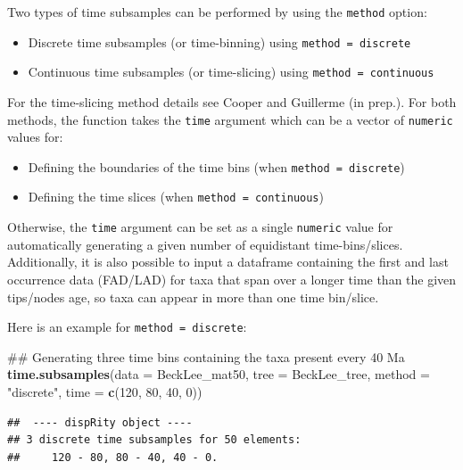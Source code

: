 \documentclass[]{book}
\newenvironment{Shaded}{\begin{snugshade}}{\end{snugshade}}
\newcommand{\KeywordTok}[1]{\textcolor[rgb]{0.13,0.29,0.53}{\textbf{#1}}}
\newcommand{\DataTypeTok}[1]{\textcolor[rgb]{0.13,0.29,0.53}{#1}}
\newcommand{\DecValTok}[1]{\textcolor[rgb]{0.00,0.00,0.81}{#1}}
\newcommand{\StringTok}[1]{\textcolor[rgb]{0.31,0.60,0.02}{#1}}
\newcommand{\NormalTok}[1]{#1}
\providecommand{\tightlist}{%
  \setlength{\itemsep}{0pt}\setlength{\parskip}{0pt}}
\theoremstyle{definition}
\theoremstyle{definition}
\theoremstyle{remark}
\begin{document}
Two types of time subsamples can be performed by using the
\texttt{method} option:

\begin{itemize}
\tightlist
\item
  Discrete time subsamples (or time-binning) using
  \texttt{method\ =\ discrete}
\item
  Continuous time subsamples (or time-slicing) using
  \texttt{method\ =\ continuous}
\end{itemize}

For the time-slicing method details see Cooper and Guillerme (in prep.).
For both methods, the function takes the \texttt{time} argument which
can be a vector of \texttt{numeric} values for:

\begin{itemize}
\tightlist
\item
  Defining the boundaries of the time bins (when
  \texttt{method\ =\ discrete})
\item
  Defining the time slices (when \texttt{method\ =\ continuous})
\end{itemize}

Otherwise, the \texttt{time} argument can be set as a single
\texttt{numeric} value for automatically generating a given number of
equidistant time-bins/slices. Additionally, it is also possible to input
a dataframe containing the first and last occurrence data (FAD/LAD) for
taxa that span over a longer time than the given tips/nodes age, so taxa
can appear in more than one time bin/slice.

Here is an example for \texttt{method\ =\ discrete}:

\begin{Shaded}
\begin{Highlighting}[]
\NormalTok{## Generating three time bins containing the taxa present every 40 Ma}
\KeywordTok{time.subsamples}\NormalTok{(}\DataTypeTok{data =}\NormalTok{ BeckLee_mat50, }\DataTypeTok{tree =}\NormalTok{ BeckLee_tree, }\DataTypeTok{method =} \StringTok{"discrete"}\NormalTok{,}
                \DataTypeTok{time =} \KeywordTok{c}\NormalTok{(}\DecValTok{120}\NormalTok{, }\DecValTok{80}\NormalTok{, }\DecValTok{40}\NormalTok{, }\DecValTok{0}\NormalTok{))}
\end{Highlighting}
\end{Shaded}

\begin{verbatim}
##  ---- dispRity object ---- 
## 3 discrete time subsamples for 50 elements:
##     120 - 80, 80 - 40, 40 - 0.
\end{verbatim}
\end{document}
